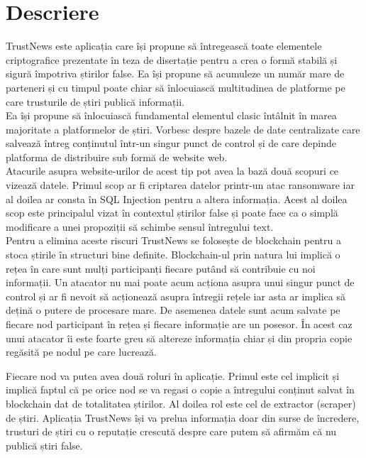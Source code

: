 
\section{Descriere}

TrustNews este aplicația care își propune să întregească toate elementele criptografice prezentate în teza de disertație pentru a crea o formă stabilă și sigură împotriva știrilor false. Ea își propune să acumuleze un număr mare de parteneri și cu timpul poate chiar să înlocuiască multitudinea de platforme pe care trusturile de știri publică informații.\\

Ea își propune să înlocuiască fundamental elementul clasic întâlnit în marea majoritate a platformelor de știri. Vorbesc despre bazele de date centralizate care salvează întreg conținutul într-un singur punct de control și de care depinde platforma de distribuire sub formă de website web.\\

Atacurile asupra website-urilor de acest tip pot avea la bază două scopuri ce vizează datele. Primul scop ar fi criptarea datelor printr-un atac ransomware iar al doilea ar consta în SQL Injection pentru a altera informația.
Acest al doilea scop este principalul vizat în contextul știrilor false și poate face ca o simplă modificare a unei propoziții să schimbe sensul întregului text.\\

Pentru a elimina aceste riscuri TrustNews se folosește de blockchain pentru a stoca știrile în structuri bine definite. Blockchain-ul prin natura lui implică o rețea în care sunt mulți participanți fiecare putând să contribuie cu noi informații. Un atacator nu mai poate acum acționa asupra unui singur punct de control și ar fi nevoit să acționează asupra întregii rețele iar asta ar implica să dețină o putere de procesare mare. De asemenea datele sunt acum salvate pe fiecare nod participant în rețea și fiecare informație are un posesor. În acest caz unui atacator îi este foarte greu să altereze informația chiar și din propria copie regăsită pe nodul pe care lucrează.\\

\clearpage

Fiecare nod va putea avea două roluri în aplicație. Primul este cel implicit și implică faptul că pe orice nod se va regasi o copie a întregului conținut salvat în blockchain dat de totalitatea știrilor. Al doilea rol este cel de extractor (scraper) de știri. Aplicația TrustNews își va prelua informația doar din surse de încredere, trusturi de știri cu o reputație crescută despre care putem să afirmăm că nu publică știri false.\\

